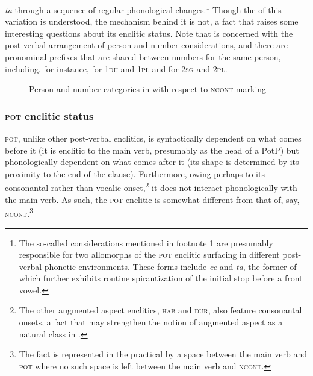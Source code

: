 \documentclass[output=paper]{LSP/langsci}
\begin{document}
\textit{ta} through a sequence of regular phonological changes.\footnote{The so-called  considerations mentioned in footnote 1 are presumably responsible for two allomorphs of the \textsc{pot} enclitic surfacing in different post-verbal phonetic environments. These forms include \textit{ce} and \textit{ta}, the former of which further exhibits routine spirantization of the initial stop before a front vowel.} Though the  of this variation is understood, the mechanism behind it is not, a fact that raises some interesting questions about its enclitic status. Note that  is concerned with the post-verbal arrangement of person and number considerations, and there are pronominal prefixes that are shared between numbers for the same person, including, for instance, for \textsc{1du} and \textsc{1pl} and for \textsc{2sg} and \textsc{2pl}.

\begin{figure}
\caption{Person and number categories in  with respect to \textsc{ncont} marking} \label{ncont}

\begin{center}
\end{center}
\end{figure}

\subsubsection{\textsc{pot} enclitic status}

\textsc{pot}, unlike other post-verbal enclitics, is syntactically dependent on what comes before it (it is enclitic to the main verb, presumably as the head of a PotP) but phonologically dependent on what comes after it (its shape is determined by its proximity to the end of the clause). Furthermore, owing perhaps to its consonantal rather than vocalic onset,\footnote{The other augmented aspect enclitics, \textsc{hab} and \textsc{dur}, also feature consonantal onsets, a fact that may strengthen the notion of augmented aspect as a natural class in .} it does not interact phonologically with the main verb. As such, the \textsc{pot} enclitic is somewhat different from that of, say, \textsc{ncont}.\footnote{The fact is represented in the  practical  by a space between the main verb and \textsc{pot} where no such space is left between the main verb and \textsc{ncont}.}
\end{document}
